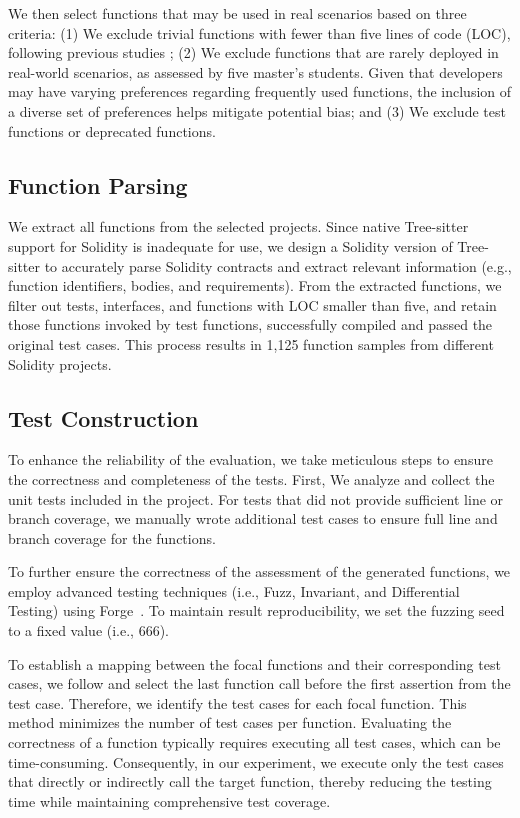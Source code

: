We then select functions that may be used in real scenarios based on three criteria: 
(1) We exclude trivial functions with fewer than five lines of code (LOC), following previous studies \citep{tse24gassmell}; 
(2) We exclude functions that are rarely deployed in real-world scenarios, as assessed by five master's students. 
Given that developers may have varying preferences regarding frequently used functions, the inclusion of a diverse set of preferences helps mitigate potential bias; 
and (3) We exclude test functions or deprecated functions.


\subsection{Function Parsing}
We extract all functions from the selected projects.
Since native Tree-sitter~\cite{treesitter} support for Solidity is inadequate for use, we design a Solidity version of Tree-sitter to accurately parse Solidity contracts and extract relevant information (e.g., function identifiers, bodies, and requirements).
From the extracted functions, we filter out tests, interfaces, and functions with LOC smaller than five, and retain those functions invoked by test functions, successfully compiled and passed the original test cases.
This process results in 1,125 function samples from different Solidity projects.

\subsection{Test Construction}
To enhance the reliability of the evaluation, we take meticulous steps to ensure the correctness and completeness of the tests.
First, We analyze and collect the unit tests included in the project. 
For tests that did not provide sufficient line or branch coverage, we manually wrote additional test cases to ensure full line and branch coverage for the functions.


To further ensure the correctness of the assessment of the generated functions, we employ advanced testing techniques (i.e., Fuzz, Invariant, and Differential Testing) using Forge~\cite{Foundry_Invariant_Test}. 
To maintain result reproducibility, we set the fuzzing seed to a fixed value (i.e., 666).


To establish a mapping between the focal functions and their corresponding test cases, we follow \citet{nie2023learning} and select the last function call before the first assertion from the test case.
Therefore, we identify the test cases for each focal function. 
This method minimizes the number of test cases per function. 
Evaluating the correctness of a function typically requires executing all test cases, which can be time-consuming. 
Consequently, in our experiment, we execute only the test cases that directly or indirectly call the target function, thereby reducing the testing time while maintaining comprehensive test coverage.

